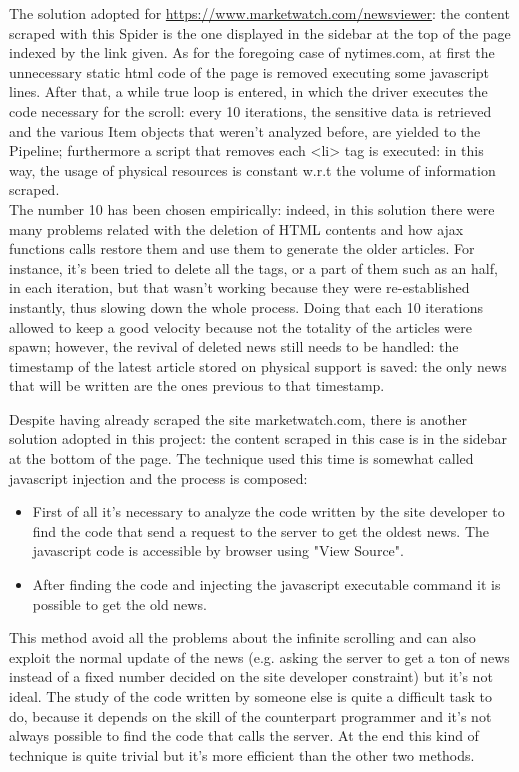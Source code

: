 \par 
The solution adopted for \url{https://www.marketwatch.com/newsviewer}: the content scraped with this Spider is the one displayed in the sidebar at the top of the page indexed by the link given. As for the foregoing case of nytimes.com, at first the unnecessary static html code of the page is removed executing some javascript lines. After that, a while true loop is entered, in which the driver executes the code necessary for the scroll: every 10 iterations, the sensitive data is retrieved and the various Item objects that weren't analyzed before, are yielded to the Pipeline; furthermore a script that removes each <li> tag is executed: in this way, the usage of physical resources is constant w.r.t the volume of information scraped. \\
The number 10 has been chosen empirically: indeed, in this solution there were many problems related with the deletion of HTML contents and how ajax functions calls restore them and use them to generate the older articles. For instance, it's been tried to delete all the tags, or a part of them such as an half, in each iteration, but that wasn't working because they were re-established instantly, thus slowing down the whole process. Doing that each 10 iterations allowed to keep a good velocity because not the totality of the articles were spawn; however, the revival of deleted news still needs to be handled: the timestamp of the latest article stored on physical support is saved: the only news that will be written are the ones previous to that timestamp.
\par 
Despite having already scraped the site marketwatch.com, there is another solution adopted in this project: the content scraped in this case is in the sidebar at the bottom of the page. The technique used this time is somewhat called javascript injection and the process is composed:
\begin{itemize}
	\item First of all it's necessary to analyze the code written by the site developer to find the code that send a request to the server to get the oldest news. The javascript code is accessible by browser using "View Source".
	\item After finding the code and injecting the javascript executable command it is possible to get the old news.
\end{itemize}
This method avoid all the problems about the infinite scrolling and can also exploit the normal update of the news (e.g. asking the server to get a ton of news instead of a fixed number decided on the site developer constraint) but it's not ideal. The study of the code written by someone else is quite a difficult task to do, because it depends on the skill of the counterpart programmer and it's not always possible to find the code that calls the server. At the end this kind of technique is quite trivial but it's more efficient than the other two methods.
\par
